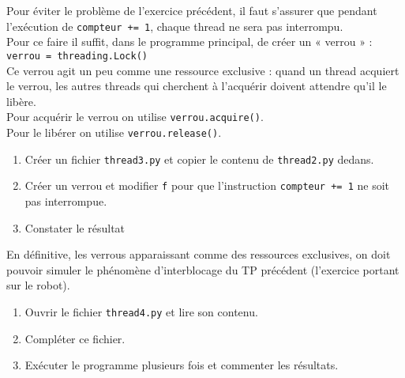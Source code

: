 \documentclass[a4paper,12pt,french]{book}
\begin{document}
\begin{exercice}[]
Pour éviter le problème de l'exercice précédent, il faut s'assurer que pendant l'exécution de \texttt{compteur += 1}, chaque thread ne sera pas interrompu.\\

Pour ce faire il suffit, dans le programme principal, de créer un « verrou » :\\
\texttt{verrou = threading.Lock()}\\
Ce verrou agit un peu comme une ressource exclusive : quand un thread acquiert le verrou, les autres threads qui cherchent à l'acquérir doivent attendre qu'il le libère.\\
Pour acquérir le verrou on utilise \texttt{verrou.acquire()}.\\
Pour le libérer on utilise \texttt{verrou.release()}.\\
\begin{enumerate}
	\item 	Créer un fichier \texttt{thread3.py} et copier le contenu de \texttt{thread2.py} dedans.
	\item 	Créer un verrou et modifier \texttt{f} pour que l'instruction \texttt{compteur += 1} ne soit pas interrompue.
    \item 	Constater le résultat
\end{enumerate}
\end{exercice}

\begin{exercice}[]
En définitive, les verrous apparaissant comme des ressources exclusives, on doit pouvoir simuler le phénomène d'interblocage du TP précédent (l'exercice portant sur le robot).
\begin{enumerate}
	\item 	Ouvrir le fichier \texttt{thread4.py} et lire son contenu.
	\item 	Compléter ce fichier.
    \item 	Exécuter le programme plusieurs fois et commenter les résultats.
\end{enumerate}
\end{exercice}
\end{document}

